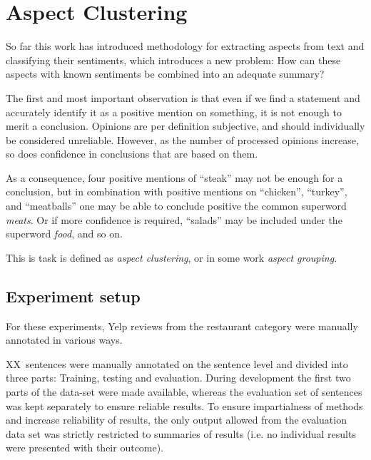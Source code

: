 \documentclass[a4paper,11pt]{kth-mag}
\newcommand{\category}{restaurant category }  %
\newcommand{\numAnnotated}{XX}
\newif\ifhasStudiedFailures
\begin{document}
\chapter{Aspect Clustering}
So far this work has introduced methodology for extracting aspects from text and classifying their sentiments, which introduces a new problem: How can these aspects with known sentiments be combined into an adequate summary?

The first and most important observation is that even if we find a statement and accurately identify it as a positive mention on something, it is not enough to merit a conclusion. Opinions are per definition subjective, and should individually be considered unreliable. However, as the number of processed opinions increase, so does confidence in conclusions that are based on them.

As a consequence, four positive mentions of ``steak'' may not be enough for a conclusion, but in combination with positive mentions on ``chicken'', ``turkey'',  and ``meatballs'' one may be able to conclude positive the common \gls{superword} \emph{meats}. Or if more confidence is required, ``salads'' may be included under the \gls{superword} \emph{food}, and so on.

This is task is defined as \emph{aspect clustering}, or in some work \emph{aspect grouping}.


\section{Experiment setup}
For these experiments, Yelp reviews from the \category were manually annotated in various ways.

\numAnnotated~sentences were manually annotated on the sentence level and divided into three parts: Training, testing and evaluation. During development the first two parts of the data-set were made available, whereas the evaluation set of sentences was kept separately to ensure reliable results. To ensure impartialness of methods and increase reliability of results, the only output allowed from the evaluation data set was strictly restricted to summaries of results (i.e. no individual results were presented with their outcome)\ifhasStudiedFailures, except for when failing instances were explicitly studied after method development was finished\fi.

\newpage
\end{document}
